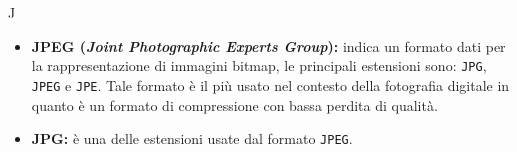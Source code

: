 \Huge J
\normalsize
\begin{itemize}
\item\textbf{JPEG (\textit{Joint Photographic Experts Group}):} indica un formato dati per la rappresentazione di immagini bitmap\g{}, le principali estensioni sono: \verb!JPG!, \verb!JPEG! e \verb!JPE!. Tale formato è il più usato nel contesto della fotografia digitale in quanto è un formato di compressione con bassa perdita di qualità.

\item\textbf{JPG:} è una delle estensioni usate dal formato \verb!JPEG!\glossario{}.
\end{itemize}
\pagebreak